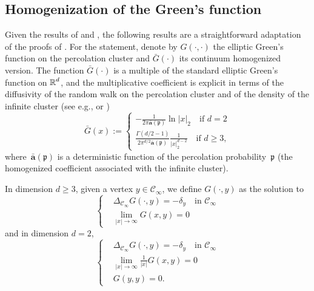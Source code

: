 \documentclass[12pt]{amsart}
\numberwithin{equation}{section}
\begin{document}
	\subsection{Homogenization of the Green's function}
	Given the results of \cite{armstrong-dario-2018} and \cite{dario-gu-green}, the following results are a straightforward adaptation of the proofs of \cite[Theorem 8.14 and Theorem 8.20]{AKM19}. 
	For the statement, denote by $G(\cdot, \cdot)$ the elliptic Green's function on the percolation cluster and $\bar{G}(\cdot)$ its continuum homogenized version. The function $\bar{G}(\cdot)$ is a multiple of the standard elliptic Green's function on $\operatorname{\mathbb{R}}^d$, and the multiplicative coefficient is explicit in terms of the diffusivity of the random walk on the percolation cluster and of the density of the infinite cluster (see e.g., \cite[(1.9)]{BH09} or \cite[(1.9)]{dario-gu-green})
	\[
	\bar{G}(x) := 
	\begin{cases}
		- \frac{1}{2\pi \bar{\mathbf{a}}(\mathfrak p)} \ln |x|_2 \quad \mbox{if~$d = 2$}  \\
		\frac{\Gamma(d/2 -1)}{2 \pi^{d/2} \bar{\mathbf{a}}(\mathfrak p)} \frac{1}{|x|_2^{d-2}} \quad \mbox{if~$d \geq 3$}, 
	\end{cases}
	\]
	where~$\bar{\mathbf{a}}( \mathfrak{p})$ is a deterministic function of the percolation probability~$ \mathfrak{p}$ (the homogenized coefficient associated with the infinite cluster).
	
	In dimension $d \geq 3$, given a vertex $y \in \mathscr{C}_{\infty}$,
	we define $G(\cdot, y)$ as the solution to
	\begin{equation} \label{eq:green-function-3D}
		\begin{cases}
			&\Delta_{\mathscr{C}_{\infty}} G(\cdot, y) = -\delta_y \quad \mbox{in $\mathscr{C}_{\infty}$} \\
			&\lim_{|x| \to \infty} G(x, y) =  0
		\end{cases}
	\end{equation}
	and in dimension $d = 2$, 
	\begin{equation} \label{eq:green-function-2D}
		\begin{cases}
			&\Delta_{\mathscr{C}_{\infty}} G(\cdot, y) = -\delta_y \quad \mbox{in $\mathscr{C}_{\infty}$} \\
			&\lim_{|x| \to \infty} \frac{1}{|x|} G(x, y) =  0 \\
			& G(y,y) = 0.
		\end{cases}
	\end{equation}
	
\end{document}

